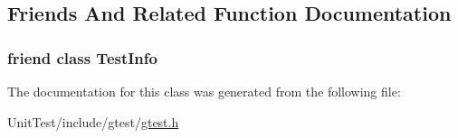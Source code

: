 \subsection{Friends And Related Function Documentation}
\hypertarget{classtesting_1_1_test_a4c49c2cdb6c328e6b709b4542f23de3c}{
\subsubsection[{Test\+Info}]{\setlength{\rightskip}{0pt plus 5cm}friend class {\bf Test\+Info}\hspace{0.3cm}{\ttfamily [friend]}}}\label{classtesting_1_1_test_a4c49c2cdb6c328e6b709b4542f23de3c}


The documentation for this class was generated from the following file\+:\begin{DoxyCompactItemize}
\item 
Unit\+Test/include/gtest/\hyperlink{gtest_8h}{gtest.\+h}\end{DoxyCompactItemize}
